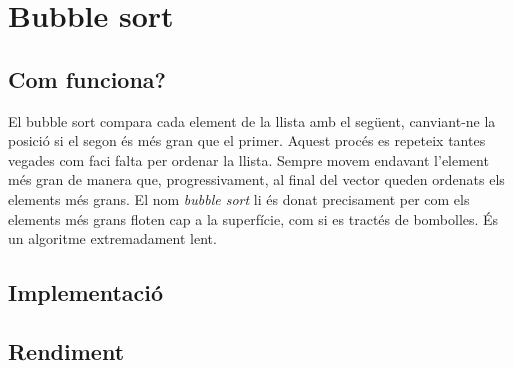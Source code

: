 \chapter{Bubble sort}

\section{Com funciona?}
El bubble sort compara cada element de la llista amb el següent, canviant-ne la posició si el segon és més gran que el primer.
Aquest procés es repeteix tantes vegades com faci falta per ordenar la llista.
Sempre movem endavant l'element més gran de manera que, progressivament, al final del vector queden ordenats els elements més grans.
El nom \textit{bubble sort} li és donat precisament per com els elements més grans floten cap a la superfície, com si es tractés de bombolles.
És un algoritme extremadament lent.

\section{Implementació}


\begin{minipage}{\textwidth}
	\section{Rendiment}
	\noindent
	\makebox[\textwidth][c]{
		
		}
	\vspace*{1em}
	\begin{center}
		\resizebox{\textwidth}{!}{}
	\end{center}
\end{minipage}